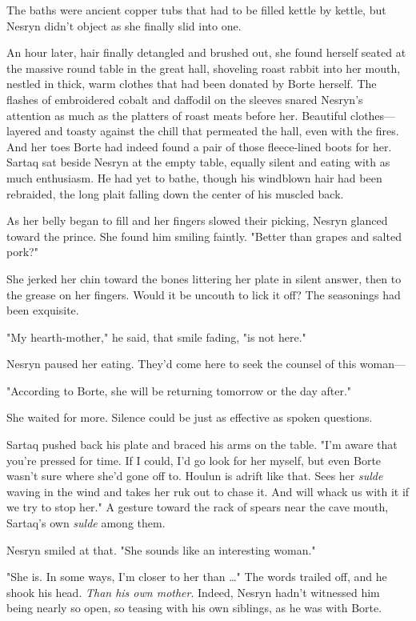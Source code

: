 The baths were ancient copper tubs that had to be filled kettle by kettle, but Nesryn didn't object as she finally slid into one.

An hour later, hair finally detangled and brushed out, she found herself seated at the massive round table in the great hall, shoveling roast rabbit into her mouth, nestled in thick, warm clothes that had been donated by Borte herself. The flashes of embroidered cobalt and daffodil on the sleeves snared Nesryn's attention as much as the platters of roast meats before her. Beautiful clothes--- layered and toasty against the chill that permeated the hall, even with the fires. And her toes
 Borte had indeed found a pair of those fleece-lined boots for her. Sartaq sat beside Nesryn at the empty table, equally silent and eating with as much enthusiasm. He had yet to bathe, though his windblown hair had been rebraided, the long plait falling down the center of his muscled back.

As her belly began to fill and her fingers slowed their picking, Nesryn glanced toward the prince. She found him smiling faintly. "Better than grapes and salted pork?"

She jerked her chin toward the bones littering her plate in silent answer, then to the grease on her fingers. Would it be uncouth to lick it off? The seasonings had been exquisite.

"My hearth-mother," he said, that smile fading, "is not here."

Nesryn paused her eating. They'd come here to seek the counsel of this woman---

"According to Borte, she will be returning tomorrow or the day after."

She waited for more. Silence could be just as effective as spoken questions.

Sartaq pushed back his plate and braced his arms on the table. "I'm aware that you're pressed for time. If I could, I'd go look for her myself, but even Borte wasn't sure where she'd gone off to. Houlun is
 adrift like that. Sees her \emph{sulde} waving in the wind and takes her ruk out to chase it. And will whack us with it if we try to stop her." A gesture toward the rack of spears near the cave mouth, Sartaq's own \emph{sulde} among them.

Nesryn smiled at that. "She sounds like an interesting woman."

"She is. In some ways, I'm closer to her than \ldots" The words trailed off, and he shook his head. \emph{Than his own mother}. Indeed, Nesryn hadn't witnessed him being nearly so open, so teasing with his own siblings, as he was with Borte.

